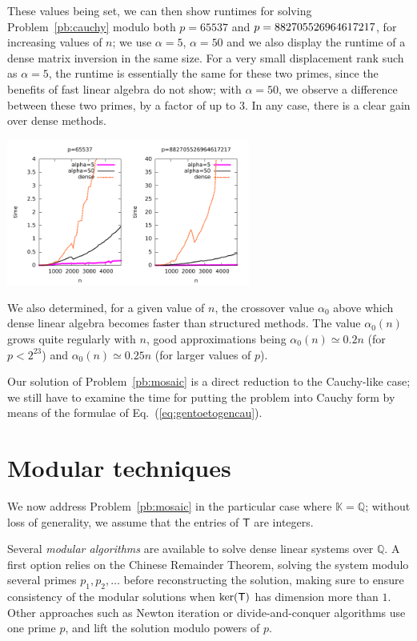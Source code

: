 \documentclass{sig-alternate}
\newcommand{\mT}{\ensuremath{\mathsf{T}}}
\newcommand{\K}{\ensuremath{\mathbb{K}}}
\newcommand{\Q}{\ensuremath{\mathbb{Q}}}
\begin{document}
These values being set, we can then show runtimes for solving
Problem~\ref{pb:cauchy} modulo both $p=65537$ and
$p=8827055\-26964617217$, for increasing values of $n$; we use
$\alpha=5$, $\alpha=50$ and we also display the runtime of a dense
matrix inversion in the same size. For a very small displacement rank
such as $\alpha=5$, the runtime is essentially the same for these two
primes, since the benefits of fast linear algebra do not show; with
$\alpha=50$, we observe a difference between these two primes, by a
factor of up to 3. In any case, there is a clear gain over dense
methods.

\includegraphics[width=8cm]{large_n-eschost-desktop.pdf}

We also determined, for a given value of $n$, the crossover value
$\alpha_0$ above which dense linear algebra becomes faster than
structured methods.  The value $\alpha_0(n)$ grows quite regularly
with $n$, good approximations being $\alpha_0(n) \simeq 0.2 n$ (for $p < 2^{23}$) and
$\alpha_0(n) \simeq 0.25 n$ (for larger values of $p$).

Our solution of Problem~\ref{pb:mosaic} is a direct reduction to the
Cauchy-like case; we still have to examine the time for putting the
problem into Cauchy form by means of the formulae of
Eq.~(\ref{eq:gentoetogencau}).



\section{Modular techniques}\label{sec:lifting}

We now address Problem~\ref{pb:mosaic} in the particular case where
$\K=\Q$; without loss of generality, we assume that the entries of
$\mT$ are integers.

Several {\em modular algorithms} are available to solve dense linear
systems over $\Q$. A first option relies on the Chinese Remainder
Theorem, solving the system modulo several primes $p_1,p_2,\dots$
before reconstructing the solution, making sure to ensure consistency
of the modular solutions when ${\rm ker}(\mT)$ has dimension more than
$1$. Other approaches such as Newton iteration or divide-and-conquer
algorithms use one prime $p$, and lift the solution modulo powers of $p$.
\end{document}
